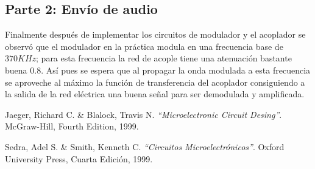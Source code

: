 \documentclass[11pt,graphicx,caption,rotating]{article}
\begin{document}
\subsection{Parte 2: Envío de audio}
\noindent
Finalmente después de implementar los circuitos de modulador y el acoplador se observó que el modulador en la práctica modula en una frecuencia base de $370 KHz$;  para esta frecuencia la red de acople tiene una atenuación bastante buena $0.8$. Así pues se espera que al propagar la onda modulada a esta frecuencia se aproveche al máximo la función de transferencia del acoplador consiguiendo a la salida de la red eléctrica una buena señal para ser demodulada y amplificada.


\begin{thebibliography}{99}
 Jaeger, Richard C. \& Blalock, Travis N.
{\em "`Microelectronic Circuit Desing"'}.
McGraw-Hill, Fourth Edition, 1999.

 Sedra, Adel S. \& Smith, Kenneth C.
{\em "`Circuitos Microelectrónicos"'}.
Oxford University Press, Cuarta Edición, 1999.
\end{thebibliography}
\end{document}
